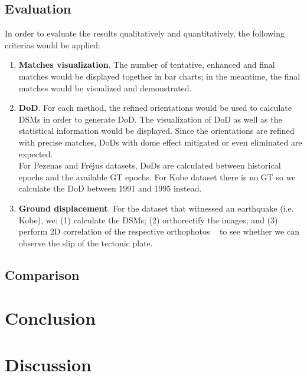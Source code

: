 \subsection{Evaluation}
In order to evaluate the results qualitatively and quantitatively, the following criterias would be applied:\\
\begin{enumerate}
	\item \textbf{Matches visualization}. The number of tentative, enhanced and final matches would be displayed together in bar charts; in the meantime, the final matches would be visualized and demonstrated.
	\item \textbf{\ac{DoD}}. For each method, the refined orientations would be used to calculate DSMs in order to generate \ac{DoD}. The visualization of \ac{DoD} as well as the statistical information would be displayed. Since the orientations are refined with precise matches, \ac{DoD}s with dome effect mitigated or even eliminated are expected.\\
	For Pezenas and Fr\'ejus datasets, DoDs are calculated between historical epochs and the available \ac{GT} epochs. For Kobe dataset there is no \ac{GT} so we calculate the \ac{DoD} between 1991 and 1995 instead.\\
	\item \textbf{Ground displacement}. For the dataset that witnessed an earthquake (i.e. Kobe), we: (1) calculate the DSMs; (2) orthorectify the images; and (3) perform 2D correlation of the respective orthophotos ~\cite{rosu2015measurement} to see whether we can observe the slip of the tectonic plate.
\end{enumerate}


\subsection{Comparison}

\section{Conclusion}

\section{Discussion}
